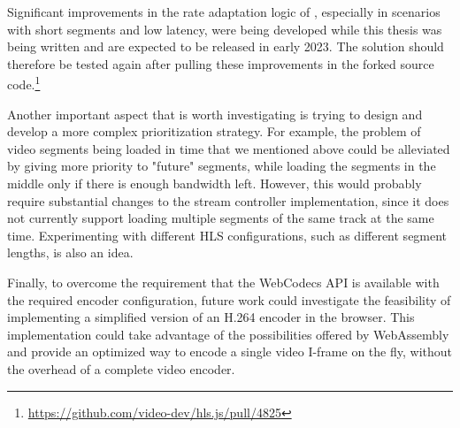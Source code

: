 Significant improvements in the rate adaptation logic of \hlsjs{}, especially in scenarios with short segments and low latency, were being developed while this thesis was being written and are expected to be released in early 2023. The solution should therefore be tested again after pulling these improvements in the forked source code.\footnote{\url{https://github.com/video-dev/hls.js/pull/4825}}

Another important aspect that is worth investigating is trying to design and develop a more complex prioritization strategy. For example, the problem of video segments being loaded in time that we mentioned above could be alleviated by giving more priority to "future" segments, while loading the segments in the middle only if there is enough bandwidth left. However, this would probably require substantial changes to the \hlsjs{} stream controller implementation, since it does not currently support loading multiple segments of the same track at the same time. Experimenting with different HLS configurations, such as different segment lengths, is also an idea.

Finally, to overcome the requirement that the WebCodecs API is available with the required encoder configuration, future work could investigate the feasibility of implementing a simplified version of an H.264 encoder in the browser. This implementation could take advantage of the possibilities offered by WebAssembly and provide an optimized way to encode a single video I-frame on the fly, without the overhead of a complete video encoder.


